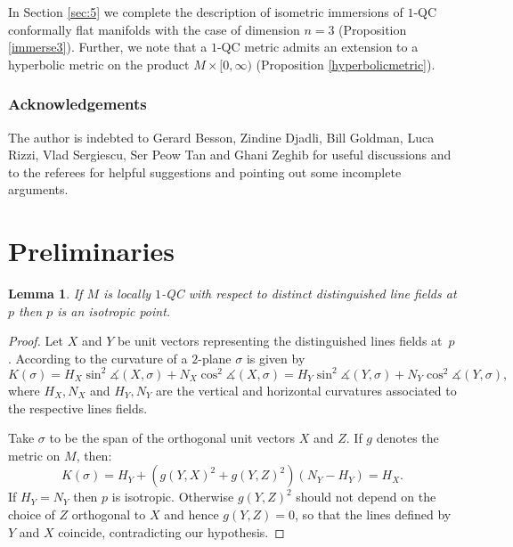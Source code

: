 \documentclass[JEP,XML,SOM,Unicode]{cedram}
\newtheorem{lemma}[theorem]{Lemma}
\theoremstyle{definition}
\theoremstyle{remark}
\numberwithin{equation}{section}
\begin{document}
In Section \ref{sec:5} we complete the description of isometric immersions of $1$-QC conformally flat manifolds with the
case of dimension $n=3$ (Proposition \ref{immerse3}). Further, we note that a $1$-QC metric admits an extension to a
hyperbolic metric on the product $M\times [0,\infty)$ (Proposition \ref{hyperbolicmetric}).

\subsubsection*{Acknowledgements}
The author is indebted to Gerard Besson,
Zindine Djadli, Bill Goldman, Luca Rizzi, Vlad Sergiescu, Ser Peow Tan and Ghani Zeghib for
useful discussions and to the referees for
helpful suggestions and pointing out some incomplete arguments.

\section{Preliminaries}\label{sec:2}

\label{section-isotropic}

\begin{lemma}\label{isotropy}
If $M$ is locally $1$-QC with respect to distinct distinguished line fields at $p$ then
$p$ is an isotropic point.
\end{lemma}
\begin{proof}
Let $X$ and $Y$ be unit vectors representing the distinguished lines fields at~$p$.
According to \cite{BP} the curvature of a $2$\nobreakdash-plane $\sigma$ is given by
\[ K(\sigma)=H_X \sin^2\measuredangle (X,\sigma) + N_X \cos^2\measuredangle (X,\sigma)=
H_Y \sin^2\measuredangle (Y,\sigma) + N_Y \cos^2\measuredangle (Y,\sigma),\]
where $H_X, N_X$ and $H_Y, N_Y$ are the vertical and horizontal curvatures associated to the respective lines fields.

Take $\sigma$ to be the span of the orthogonal unit vectors $X$ and $Z$. If $g$ denotes the metric on $M$, then:
\[K(\sigma)=H_Y + (g(Y,X)^2+ g(Y, Z)^2)(N_Y-H_Y)=H_X.\]
If $H_Y=N_Y$ then $p$ is isotropic. Otherwise $g(Y, Z)^2$ should not depend on the choice of
$Z$ orthogonal to $X$ and hence $g(Y, Z)=0$, so that the lines defined by $Y$ and $X$ coincide, contradicting our hypothesis.
\end{proof}
\end{document}
